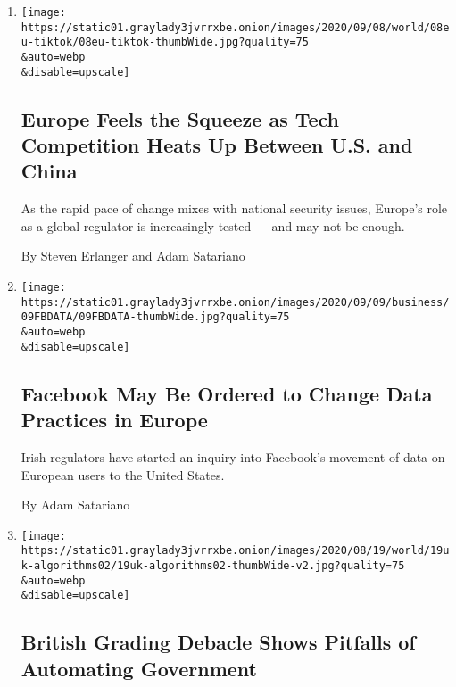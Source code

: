 \begin{enumerate}
\def\labelenumi{\arabic{enumi}.}
\item
  \href{/2020/09/11/world/europe/eu-us-china-technology.html}{}

  \texttt{[image: https://static01.graylady3jvrrxbe.onion/images/2020/09/08/world/08eu-tiktok/08eu-tiktok-thumbWide.jpg?quality=75\\\&auto=webp\\\&disable=upscale]}

  \hypertarget{europe-feels-the-squeeze-as-tech-competition-heats-up-between-us-and-china}{%
  \subsection{Europe Feels the Squeeze as Tech Competition Heats Up
  Between U.S. and
  China}\label{europe-feels-the-squeeze-as-tech-competition-heats-up-between-us-and-china}}

  As the rapid pace of change mixes with national security issues,
  Europe's role as a global regulator is increasingly tested --- and may
  not be enough.

  By Steven Erlanger and Adam Satariano
\item
  \href{/2020/09/09/technology/facebook-european-union-data-privacy.html}{}

  \texttt{[image: https://static01.graylady3jvrrxbe.onion/images/2020/09/09/business/09FBDATA/09FBDATA-thumbWide.jpg?quality=75\\\&auto=webp\\\&disable=upscale]}

  \hypertarget{facebook-may-be-ordered-to-change-data-practices-in-europe}{%
  \subsection{Facebook May Be Ordered to Change Data Practices in
  Europe}\label{facebook-may-be-ordered-to-change-data-practices-in-europe}}

  Irish regulators have started an inquiry into Facebook's movement of
  data on European users to the United States.

  By Adam Satariano
\item
  \href{/2020/08/20/world/europe/uk-england-grading-algorithm.html}{}

  \texttt{[image: https://static01.graylady3jvrrxbe.onion/images/2020/08/19/world/19uk-algorithms02/19uk-algorithms02-thumbWide-v2.jpg?quality=75\\\&auto=webp\\\&disable=upscale]}

  \hypertarget{british-grading-debacle-shows-pitfalls-of-automating-government}{%
  \subsection{British Grading Debacle Shows Pitfalls of Automating
  Government}\label{british-grading-debacle-shows-pitfalls-of-automating-government}}


\end{enumerate}
